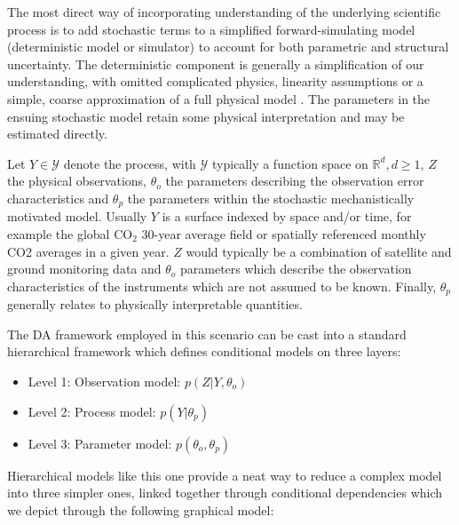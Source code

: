 \documentclass[10pt,a4paper]{article}
\begin{document}
The most direct way of incorporating understanding of the underlying scientific process is to add stochastic terms to a simplified forward-simulating model (deterministic model or simulator) to account for both parametric and structural uncertainty. The deterministic component is generally a simplification of our understanding, with omitted complicated physics, linearity assumptions or a simple, coarse  approximation of a full physical model \citep{Berliner_2003}. The parameters in the ensuing stochastic model retain some physical interpretation and may be estimated directly. 

Let $Y \in \mathcal{Y}$ denote the process, with $\mathcal{Y}$ typically a function space on $\mathbb{R}^d, d \ge 1$, $Z$ the physical observations, $\theta_o$ the parameters describing the observation error characteristics and $\theta_p$ the parameters within the stochastic mechanistically motivated model. Usually $Y$ is a surface indexed by space and/or time, for example the global CO$_2$ 30-year average field or spatially referenced monthly CO2 averages in a given year. $Z$ would typically be a combination of satellite and ground monitoring data and $\theta_o$ parameters which describe the observation characteristics of the instruments which are not assumed to be known. Finally, $\theta_p$ generally relates to physically interpretable quantities.

 The DA framework employed in this scenario can be cast into a standard hierarchical framework \citep[e.g.][]{Wikle_2003} which defines conditional models on three layers:
\begin{itemize}
\item Level 1: Observation model: $p(Z | Y, \theta_o)$
\item Level 2: Process model: $p(Y | \theta_p)$
\item Level 3: Parameter model: $p(\theta_o, \theta_p)$
\end{itemize}
\noindent Hierarchical models like this one provide a neat way to reduce a complex model into three simpler ones, linked together through conditional dependencies which we depict through the following graphical model:

\begin{figure}[h!]
\centering
{}
\end{figure}
\end{document}
